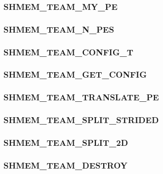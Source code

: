 \documentclass[10pt,oneside]{book}
\begin{document}
\subsubsection{\textbf{SHMEM\_TEAM\_MY\_PE}}\label{subsec:shmem_team_my_pe}


\subsubsection{\textbf{SHMEM\_TEAM\_N\_PES}}\label{subsec:shmem_team_n_pes}


\subsubsection{\textbf{SHMEM\_TEAM\_CONFIG\_T}}
\label{subsec:shmem_team_config_t}


\subsubsection{\textbf{SHMEM\_TEAM\_GET\_CONFIG}}\label{subsec:shmem_team_get_config}


\subsubsection{\textbf{SHMEM\_TEAM\_TRANSLATE\_PE}}\label{subsec:shmem_team_translate_pe}


\subsubsection{\textbf{SHMEM\_TEAM\_SPLIT\_STRIDED}}\label{subsec:shmem_team_split_strided}


\subsubsection{\textbf{SHMEM\_TEAM\_SPLIT\_2D}}\label{subsec:shmem_team_split_2d}


\subsubsection{\textbf{SHMEM\_TEAM\_DESTROY}}\label{subsec:shmem_team_destroy}

\end{document}
